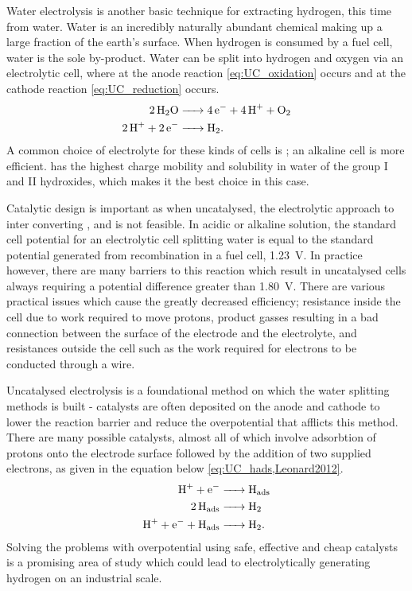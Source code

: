 Water electrolysis is another basic technique for extracting hydrogen, this time from water.
Water is an incredibly naturally abundant chemical making up a large fraction of the earth's surface.
When hydrogen is consumed by a fuel cell, water is the sole by-product.
Water can be split into hydrogen and oxygen via an electrolytic cell, where at the anode reaction \eqref{eq:UC_oxidation} occurs and at the cathode reaction \eqref{eq:UC_reduction} occurs.
\begin{align}
	\ce{2H2O &-> 4e- + 4H+ + O2} \label{eq:UC_oxidation} \\
	\ce{2H+ + 2e- &-> H2} \label{eq:UC_reduction}
.\end{align}
A common choice of electrolyte for these kinds of cells is ; an alkaline cell is more efficient\cite{merrill2006}.
 has the highest charge mobility and solubility in water of the group I and II hydroxides, which makes it the best choice in this case.

Catalytic design is important as when uncatalysed, the electrolytic approach to inter converting  ,  and   is not feasible.
In acidic or alkaline solution, the standard cell potential for an electrolytic cell splitting water is equal to the standard potential generated from recombination in a fuel cell, \SI{1.23}{\volt}\cite{Peng2020}.
In practice however, there are many barriers to this reaction which result in uncatalysed cells always requiring a potential difference greater than \SI{1.80}{\volt}.
There are various practical issues which cause the greatly decreased efficiency; resistance inside the cell due to work required to move protons, product gasses resulting in a bad connection between the surface of the electrode and the electrolyte, and resistances outside the cell such as the work required for electrons to be conducted through a wire.

Uncatalysed electrolysis is a foundational method on which the water splitting methods is built - catalysts are often deposited on the anode and cathode to lower the reaction barrier and reduce the overpotential that afflicts this method.
There are many possible catalysts, almost all of which involve adsorbtion of protons onto the electrode surface followed by the addition of two supplied electrons, as given in the equation below \eqref{eq:UC_hads,Leonard2012}.
\begin{align}
	\ce{H+ + e- &-> H_{ads}}\\
	\ce{2H_{ads} &-> H2}\\
	\ce{H+ + e- + H_{ads} &-> H2} \label{eq:UC_hads}
.\end{align}
Solving the problems with overpotential using safe, effective and cheap catalysts is a promising area of study which could lead to electrolytically generating hydrogen on an industrial scale.

